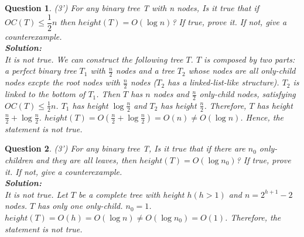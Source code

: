 \documentclass[10.5pt]{article}
\newtheorem{Q}{Question}
\begin{document}
	\begin{Q}
		(3') For any binary tree T with n nodes, Is it true that if $OC(T)\leq\dfrac{1}{2}n$ then $height(T)=O(\log n)$? If true, prove it. If not, give a counterexample.\\
		\textbf{Solution:}\\
		\textup{It is not true. We can construct the following tree $T$. $T$ is composed by two parts: a perfect binary tree $T_1$ with $\frac n2$ nodes and a tree $T_2$ whose nodes are all only-child nodes excpte the root nodes with $\frac n2$ nodes ($T_2$ has a linked-list-like structure). $T_2$ is linked to the bottom of $T_1$. Then $T$ has $n$ nodes and $\frac n2$ only-child nodes, satisfying $OC(T) \le \frac 12 n$. $T_1$ has height $\log \frac n2$ and $T_2$ has height $\frac n2$. Therefore, $T$ has height$\frac n 2 + \log\frac n 2$. $height(T) = O(\frac n2 + \log \frac n 2) = O(n) \neq O(\log n)$. Hence, the statement is not true.}
	\end{Q}

	\vspace{6cm}
	\begin{Q}
		(3') For any binary tree T, Is it true that if there are $n_0$ only-children and they are all leaves, then $height(T)=O(\log {n_0})$?
		If true, prove it. If not, give a counterexample.\\
		\textbf{Solution:}\\
		\textup{It is not true. Let $T$ be a complete tree with height $h(h > 1)$ and $n = 2^{h + 1} - 2$ nodes. $T$ has only one only-child. $n_0 = 1$. $height(T) = O(h) = O(\log n) \neq O(\log n_0) = O(1)$. Therefore, the statement is not true.}
	\end{Q}
\end{document}

